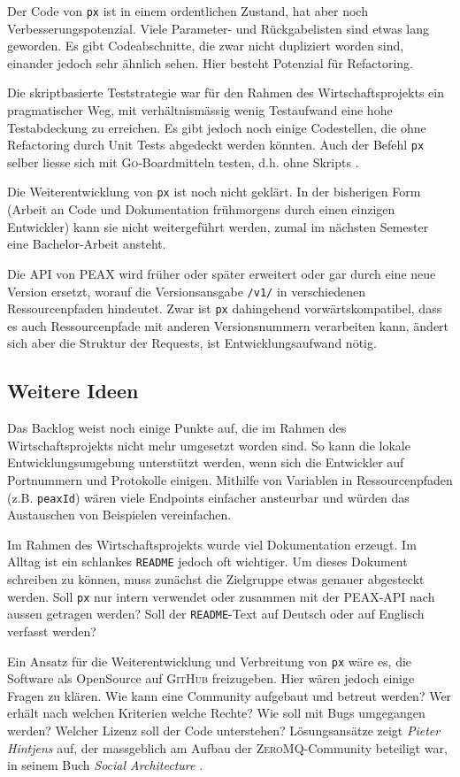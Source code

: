 Der Code von \texttt{px} ist in einem ordentlichen Zustand, hat aber noch Verbesserungspotenzial. Viele Parameter- und Rückgabelisten sind etwas lang geworden. Es gibt Codeabschnitte, die zwar nicht dupliziert worden sind, einander jedoch sehr ähnlich sehen. Hier besteht Potenzial für Refactoring.

Die skriptbasierte Teststrategie war für den Rahmen des Wirtschaftsprojekts ein pragmatischer Weg, mit verhältnismässig wenig Testaufwand eine hohe Testabdeckung zu erreichen. Es gibt jedoch noch einige Codestellen, die ohne Refactoring durch Unit Tests abgedeckt werden könnten. Auch der Befehl \texttt{px} selber liesse sich mit \textsc{Go}-Boardmitteln testen, d.h. ohne Skripts \cite[S. 308-310]{gopl}.

Die Weiterentwicklung von \texttt{px} ist noch nicht geklärt. In der bisherigen Form (Arbeit an Code und Dokumentation frühmorgens durch einen einzigen Entwickler) kann sie nicht weitergeführt werden, zumal im nächsten Semester eine Bachelor-Arbeit ansteht.

Die API von PEAX wird früher oder später erweitert oder gar durch eine neue Version ersetzt, worauf die Versionsansgabe \texttt{/v1/} in verschiedenen Ressourcenpfaden hindeutet. Zwar ist \texttt{px} dahingehend vorwärtskompatibel, dass es auch Ressourcenpfade mit anderen Versionsnummern verarbeiten kann, ändert sich aber die Struktur der Requests, ist Entwicklungsaufwand nötig.

\subsection{Weitere Ideen}

Das Backlog weist noch einige Punkte auf, die im Rahmen des Wirtschaftsprojekts nicht mehr umgesetzt worden sind. So kann die lokale Entwicklungsumgebung unterstützt werden, wenn sich die Entwickler auf Portnummern und Protokolle einigen. Mithilfe von Variablen in Ressourcenpfaden (z.B. \texttt{peaxId}) wären viele Endpoints einfacher ansteurbar und würden das Austauschen von Beispielen vereinfachen.

Im Rahmen des Wirtschaftsprojekts wurde viel Dokumentation erzeugt. Im Alltag ist ein schlankes \texttt{README} jedoch oft wichtiger. Um dieses Dokument schreiben zu können, muss zunächst die Zielgruppe etwas genauer abgesteckt werden. Soll \texttt{px} nur intern verwendet oder zusammen mit der PEAX-API nach aussen getragen werden? Soll der \texttt{README}-Text auf Deutsch oder auf Englisch verfasst werden?

Ein Ansatz für die Weiterentwicklung und Verbreitung von \texttt{px} wäre es, die Software als OpenSource auf \textsc{GitHub} freizugeben. Hier wären jedoch einige Fragen zu klären. Wie kann eine Community aufgebaut und betreut werden? Wer erhält nach welchen Kriterien welche Rechte? Wie soll mit Bugs umgegangen werden? Welcher Lizenz soll der Code unterstehen? Lösungsansätze zeigt \textit{Pieter Hintjens} auf, der massgeblich am Aufbau der \textsc{ZeroMQ}-Community beteiligt war, in seinem Buch \textit{Social Architecture} \cite{social-architecture}.
